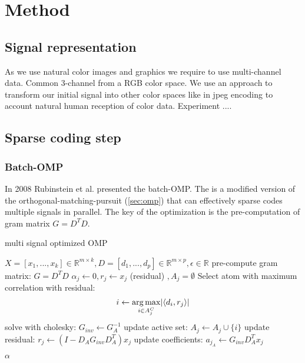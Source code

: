 \chapter{Method}


\section{Signal representation}
As we use natural color images and graphics we require to use multi-channel
data. Common 3-channel from a RGB color space. %
We use an approach to transform our initial signal into other color spaces like
in jpeg encoding to account natural human reception of color data. Experiment
....


\section{Sparse coding step}
\subsection{Batch-OMP}
In 2008 Rubinstein et al.\cite{Rubinstein2008} presented the batch-OMP. The
 is a modified version of the
orthogonal-matching-pursuit (\ref{sec:omp}) that can effectively sparse codes
multiple signals in parallel. The key of the optimization is the pre-computation
of gram matrix $G=D^TD$.


\begin{algorithm}
\caption{multi signal optimized OMP}
\label{alg:batchOMP}
\begin{algorithmic}[1]
\REQUIRE $X =[x_1,...,x_k]  \in \mathbb{R}^{m \times k}, D  =[d_1,...,d_p]  \in \mathbb{R}^{m\times p}, \epsilon \in \mathbb{R}$
\STATE pre-compute gram matrix: $G=D^TD$
\STATE $\alpha_j \gets 0, r_j \gets x_j $ (residual) $, A_j=\emptyset$
\STATE Select atom with maximum correlation with residual: 
\begin{equation*}
i \gets \operatorname*{arg\,max}_{i \in A_j^C} \lvert \left<d_i,r_j\right> \rvert
\end{equation*}
\STATE solve with cholesky: $G_{inv} \gets G_A^{-1}$
\STATE update active set: $A_j \gets A_j \cup \{i\} $
\STATE update residual: $r_j \gets \left(I-D_AG_{inv}D_A^T \right)x_j$
\STATE update coefficients: $a_{j_A} \gets G_{inv} D_A^T x_j $
\ENDFOR 
\ENDFOR 

\RETURN $\alpha$
\end{algorithmic}
\end{algorithm}

